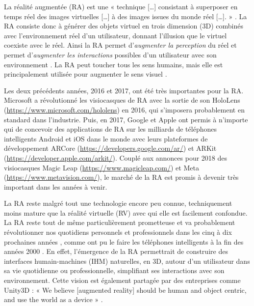 La réalité augmentée (RA) est une « technique [\dots] consistant à superposer en temps réel des images virtuelles [\dots] à des images issues du monde réel [\dots]. » \citep{OQLFRA2017}. La RA consiste donc à générer des objets virtuel en trois dimension (3D) combinés avec l'environnement réel d'un utilisateur, donnant l'illusion que le virtuel coexiste avec le réel. Ainsi la RA permet d'\emph{augmenter la perception} du réel et permet d'\emph{augmenter les interactions} possibles d'un utilisateur avec son environnement \citep{Azuma1997}. La RA peut toucher tous les sens humains, mais elle est principalement utilisée pour augmenter le sens visuel .

Les deux précédents années, 2016 et 2017, ont été très importantes pour la RA. Microsoft a révolutionné les visiocasques de RA avec la sortie de son HoloLens (\url{https://www.microsoft.com/hololens}) en 2016, qui s'imposera probablement en standard dans l'industrie. Puis, en 2017, Google et Apple ont permis à n'importe qui de concevoir des applications de RA sur les milliards de téléphones intelligents Android et iOS dans le monde avec leurs plateformes de développement ARCore (\url{https://developers.google.com/ar/}) et ARKit (\url{https://developer.apple.com/arkit/}). Couplé aux annonces pour 2018 des visiocasques Magic Leap (\url{https://www.magicleap.com/}) et Meta (\url{https://www.metavision.com/}), le marché de la RA est promis à devenir très important dans les années à venir.


La RA reste malgré tout une technologie encore peu connue, techniquement moins mature que la réalité virtuelle (RV) avec qui elle est facilement confondue. La RA reste tout de même particulièrement prometteuse et va probablement révolutionner nos quotidiens personnels et professionnels dans les cinq à dix prochaines années , comme ont pu le faire les téléphones intelligents à la fin des années 2000 \citep{Chaffey2018}. En effet, l'émergence de la RA permettrait de construire des interfaces humain-machines (IHM) naturelles, en 3D, autour d'un utilisateur dans sa vie quotidienne ou professionnelle, simplifiant ses interactions avec son environnement. Cette vision est également partagée par des entreprises comme Unity3D : « We believe [augmented reality] should be human and object centric, and use the world as a device » \citep{UnityFutureMRPartIII2017}.

